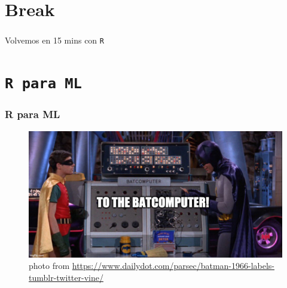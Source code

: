 \documentclass[
  shownotes,
  xcolor={svgnames},
  hyperref={colorlinks,citecolor=DarkBlue,linkcolor=DarkRed,urlcolor=DarkBlue}
  , aspectratio=169]{beamer}
\begin{document}
\section{Break}
\begin{frame}
\frametitle{}

\begin{centering}
\huge
\textcolor{andesred}{Volvemos en 15 mins con \texttt{R} }

\end{centering}

\end{frame}
\section{\texttt{R para ML}}
\begin{frame}
\frametitle{R para ML}

\begin{figure}[H] \centering
  \centering
  \includegraphics[scale=0.35]{figures/baticomputer_meme.jpg}
  \\
  \tiny photo from \url{https://www.dailydot.com/parsec/batman-1966-labels-tumblr-twitter-vine/}
\end{figure}

\end{frame}
\end{document}
